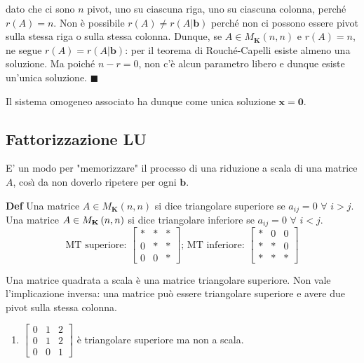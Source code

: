 \documentclass{article}
\begin{document}
dato che ci sono $n$ pivot, uno su ciascuna riga, uno su ciascuna colonna,
perch\'{e} $r\left( A\right) =n$. Non \`{e} possibile $r\left( A\right) \neq
r\left( A|\mathbf{b}\right) $ perch\'{e} non ci possono essere pivot sulla
stessa riga o sulla stessa colonna. Dunque, se $A\in M_{\mathbf{K}}\left(
n,n\right) $ e $r\left( A\right) =n$, ne segue $r\left( A\right) =r\left( A|%
\mathbf{b}\right) $: per il teorema di Rouch\'{e}-Capelli esiste almeno una
soluzione. Ma poich\'{e} $n-r=0$, non c'\`{e} alcun parametro libero e
dunque esiste un'unica soluzione. $\blacksquare $

Il sistema omogeneo associato ha dunque come unica soluzione $\mathbf{x=0}$.

\subsection{Fattorizzazione LU}

E' un modo per "memorizzare" il processo di una riduzione a scala di una
matrice $A$, cos\`{\i} da non doverlo ripetere per ogni $\mathbf{b}$.

\textbf{Def} Una matrice $A\in M_{\mathbf{K}}\left( n,n\right) $ si dice
triangolare superiore se $a_{ij}=0$ $\forall $ $i>j$. Una matrice $A\in M_{%
\mathbf{K}}\left( n,n\right) $ si dice triangolare inferiore se $a_{ij}=0$ $%
\forall $ $i<j$.%
\begin{equation*}
\text{MT superiore: }\left[ 
\begin{array}{ccc}
\ast & \ast & \ast \\ 
0 & \ast & \ast \\ 
0 & 0 & \ast%
\end{array}%
\right] \text{; MT inferiore: }\left[ 
\begin{array}{ccc}
\ast & 0 & 0 \\ 
\ast & \ast & 0 \\ 
\ast & \ast & \ast%
\end{array}%
\right]
\end{equation*}

Una matrice quadrata a scala \`{e} una matrice triangolare superiore. Non
vale l'implicazione inversa: una matrice pu\`{o} essere triangolare
superiore e avere due pivot sulla stessa colonna.

\begin{enumerate}
\item $\left[ 
\begin{array}{ccc}
0 & 1 & 2 \\ 
0 & 1 & 2 \\ 
0 & 0 & 1%
\end{array}%
\right] $ \`{e} triangolare superiore ma non a scala.
\end{enumerate}
\end{document}
